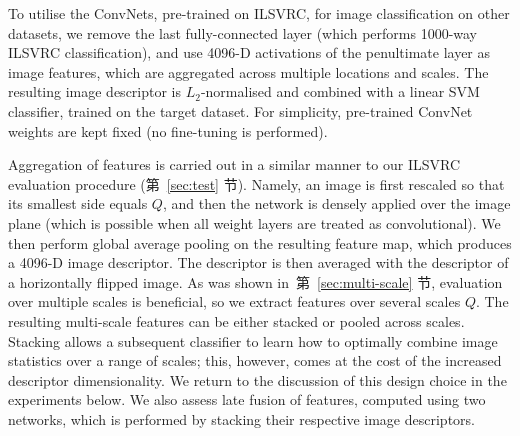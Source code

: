 \documentclass{article} %
\makeatletter
\newcommand{\sref}[1]{第~\ref{#1} 节}
\newcommand*{\eg}{e.g.\@\xspace}
\makeatother
\begin{document}
To utilise the ConvNets, pre-trained on ILSVRC, for image classification on other datasets, we remove the last fully-connected layer (which performs 1000-way ILSVRC classification), and use 4096-D activations of the penultimate layer as image features, which are aggregated across multiple locations and scales. The resulting image descriptor is $L_2$-normalised and combined with a linear SVM classifier, trained on the target dataset. For simplicity, pre-trained ConvNet weights are kept fixed (no fine-tuning is performed). 

Aggregation of features is carried out in a similar manner to our ILSVRC evaluation procedure (\sref{sec:test}). Namely, an image is first rescaled so that its smallest side equals $Q$, and then the network is densely applied over the image plane (which is possible when all weight layers are treated as convolutional). We then perform global average pooling on the resulting feature map, which produces a 4096-D image descriptor. The descriptor is then averaged with the descriptor of a horizontally flipped image.
As was shown in~\sref{sec:multi-scale}, evaluation over multiple scales is beneficial, so we extract features over several scales $Q$.
The resulting multi-scale features can be either stacked or pooled across scales.
Stacking allows a subsequent classifier to learn how to optimally combine image statistics over a range of scales; this, however, comes at the cost of the increased descriptor dimensionality.
We return to the discussion of this design choice in the experiments below.
We also assess late fusion of features, computed using two networks, which is performed by stacking their respective image descriptors.

\end{document}
